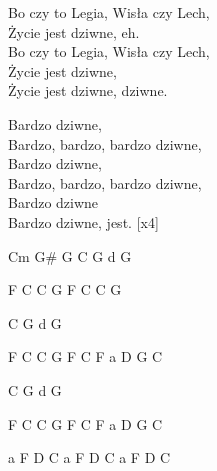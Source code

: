 \begin{text}
Bo czy to Legia, Wisła czy Lech,\\
Życie jest dziwne, eh.\\
Bo czy to Legia, Wisła czy Lech,\\
Życie jest dziwne,\\
Życie jest dziwne, dziwne.

Bardzo dziwne,\\
Bardzo, bardzo, bardzo dziwne,\\
Bardzo dziwne,\\
Bardzo, bardzo, bardzo dziwne,\\
Bardzo dziwne\\
Bardzo dziwne, jest. [x4]
\end{text}
\begin{chord}
Cm G# G
C
G
d
G

F C
C G
F C
C G

C
G
d
G

F C
C G
F C
F a D G C

C
G
d
G

F C
C G
F C
F a D G C

a 
F D C
a 
F D C 
a 
F D C 
\end{chord}